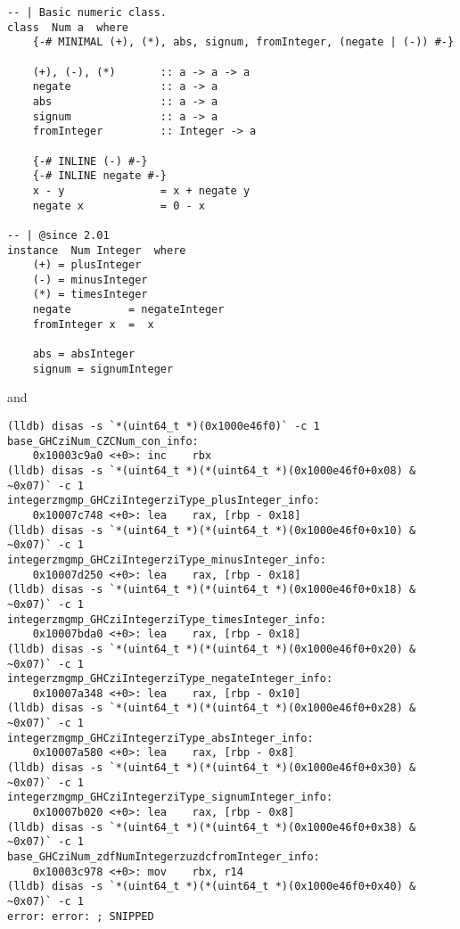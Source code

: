 \documentclass[letterpaper]{article}
\begin{document}
\begin{verbatim}
-- | Basic numeric class.
class  Num a  where
    {-# MINIMAL (+), (*), abs, signum, fromInteger, (negate | (-)) #-}

    (+), (-), (*)       :: a -> a -> a
    negate              :: a -> a
    abs                 :: a -> a
    signum              :: a -> a
    fromInteger         :: Integer -> a

    {-# INLINE (-) #-}
    {-# INLINE negate #-}
    x - y               = x + negate y
    negate x            = 0 - x

-- | @since 2.01
instance  Num Integer  where
    (+) = plusInteger
    (-) = minusInteger
    (*) = timesInteger
    negate         = negateInteger
    fromInteger x  =  x

    abs = absInteger
    signum = signumInteger
\end{verbatim}

and

\begin{verbatim}
(lldb) disas -s `*(uint64_t *)(0x1000e46f0)` -c 1
base_GHCziNum_CZCNum_con_info:
    0x10003c9a0 <+0>: inc    rbx
(lldb) disas -s `*(uint64_t *)(*(uint64_t *)(0x1000e46f0+0x08) & ~0x07)` -c 1
integerzmgmp_GHCziIntegerziType_plusInteger_info:
    0x10007c748 <+0>: lea    rax, [rbp - 0x18]
(lldb) disas -s `*(uint64_t *)(*(uint64_t *)(0x1000e46f0+0x10) & ~0x07)` -c 1
integerzmgmp_GHCziIntegerziType_minusInteger_info:
    0x10007d250 <+0>: lea    rax, [rbp - 0x18]
(lldb) disas -s `*(uint64_t *)(*(uint64_t *)(0x1000e46f0+0x18) & ~0x07)` -c 1
integerzmgmp_GHCziIntegerziType_timesInteger_info:
    0x10007bda0 <+0>: lea    rax, [rbp - 0x18]
(lldb) disas -s `*(uint64_t *)(*(uint64_t *)(0x1000e46f0+0x20) & ~0x07)` -c 1
integerzmgmp_GHCziIntegerziType_negateInteger_info:
    0x10007a348 <+0>: lea    rax, [rbp - 0x10]
(lldb) disas -s `*(uint64_t *)(*(uint64_t *)(0x1000e46f0+0x28) & ~0x07)` -c 1
integerzmgmp_GHCziIntegerziType_absInteger_info:
    0x10007a580 <+0>: lea    rax, [rbp - 0x8]
(lldb) disas -s `*(uint64_t *)(*(uint64_t *)(0x1000e46f0+0x30) & ~0x07)` -c 1
integerzmgmp_GHCziIntegerziType_signumInteger_info:
    0x10007b020 <+0>: lea    rax, [rbp - 0x8]
(lldb) disas -s `*(uint64_t *)(*(uint64_t *)(0x1000e46f0+0x38) & ~0x07)` -c 1
base_GHCziNum_zdfNumIntegerzuzdcfromInteger_info:
    0x10003c978 <+0>: mov    rbx, r14
(lldb) disas -s `*(uint64_t *)(*(uint64_t *)(0x1000e46f0+0x40) & ~0x07)` -c 1
error: error: ; SNIPPED
\end{verbatim}
\end{document}
